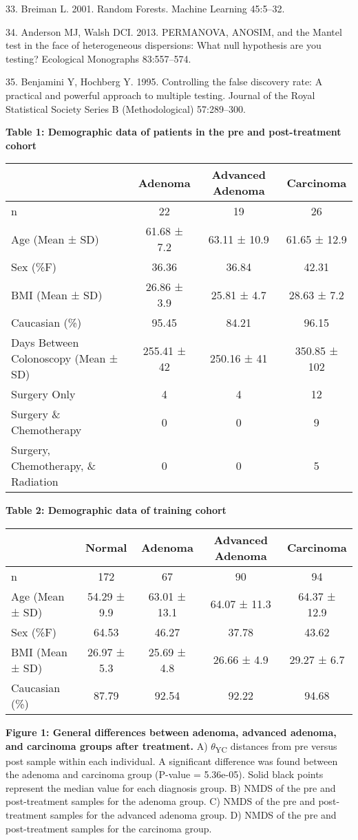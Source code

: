 \documentclass[12pt,]{article}
\begin{document}
\hypertarget{ref-breiman_random_2001}{}
33. Breiman L. 2001. Random Forests. Machine Learning 45:5--32.

\hypertarget{ref-anderson_permanova_2013}{}
34. Anderson MJ, Walsh DCI. 2013. PERMANOVA, ANOSIM, and the Mantel test
in the face of heterogeneous dispersions: What null hypothesis are you
testing? Ecological Monographs 83:557--574.

\hypertarget{ref-benjamini_controlling_1995}{}
35. Benjamini Y, Hochberg Y. 1995. Controlling the false discovery rate:
A practical and powerful approach to multiple testing. Journal of the
Royal Statistical Society Series B (Methodological) 57:289--300.

\newpage

\textbf{Table 1: Demographic data of patients in the pre and
post-treatment cohort}

\begin{longtable}[]{@{}lccc@{}}
\toprule
& Adenoma & Advanced Adenoma & Carcinoma\tabularnewline
\midrule
\endhead
n & 22 & 19 & 26\tabularnewline
Age (Mean ± SD) & 61.68 ± 7.2 & 63.11 ± 10.9 & 61.65 ±
12.9\tabularnewline
Sex (\%F) & 36.36 & 36.84 & 42.31\tabularnewline
BMI (Mean ± SD) & 26.86 ± 3.9 & 25.81 ± 4.7 & 28.63 ± 7.2\tabularnewline
Caucasian (\%) & 95.45 & 84.21 & 96.15\tabularnewline
Days Between Colonoscopy (Mean ± SD) & 255.41 ± 42 & 250.16 ± 41 &
350.85 ± 102\tabularnewline
Surgery Only & 4 & 4 & 12\tabularnewline
Surgery \& Chemotherapy & 0 & 0 & 9\tabularnewline
Surgery, Chemotherapy, \& Radiation & 0 & 0 & 5\tabularnewline
\bottomrule
\end{longtable}

\newpage

\textbf{Table 2: Demographic data of training cohort}

\begin{longtable}[]{@{}lcccc@{}}
\toprule
& Normal & Adenoma & Advanced Adenoma & Carcinoma\tabularnewline
\midrule
\endhead
n & 172 & 67 & 90 & 94\tabularnewline
Age (Mean ± SD) & 54.29 ± 9.9 & 63.01 ± 13.1 & 64.07 ± 11.3 & 64.37 ±
12.9\tabularnewline
Sex (\%F) & 64.53 & 46.27 & 37.78 & 43.62\tabularnewline
BMI (Mean ± SD) & 26.97 ± 5.3 & 25.69 ± 4.8 & 26.66 ± 4.9 & 29.27 ±
6.7\tabularnewline
Caucasian (\%) & 87.79 & 92.54 & 92.22 & 94.68\tabularnewline
\bottomrule
\end{longtable}

\newpage

\textbf{Figure 1: General differences between adenoma, advanced adenoma,
and carcinoma groups after treatment.} A) \(\theta\)\textsubscript{YC}
distances from pre versus post sample within each individual. A
significant difference was found between the adenoma and carcinoma group
(P-value = 5.36e-05). Solid black points represent the median value for
each diagnosis group. B) NMDS of the pre and post-treatment samples for
the adenoma group. C) NMDS of the pre and post-treatment samples for the
advanced adenoma group. D) NMDS of the pre and post-treatment samples
for the carcinoma group.
\end{document}
